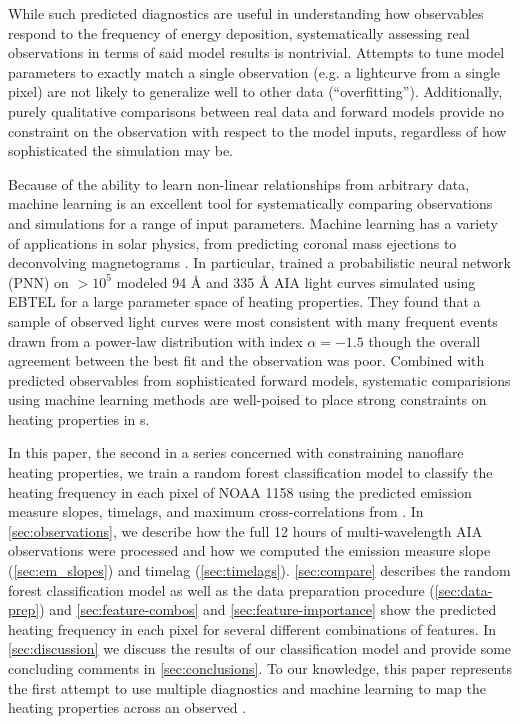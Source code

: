 While such predicted diagnostics are useful in understanding how observables respond to the frequency of energy deposition, systematically assessing real observations in terms of said model results is nontrivial. Attempts to tune model parameters to exactly match a single observation (e.g. a lightcurve from a single pixel) are not likely to generalize well to other data (``overfitting''). Additionally, purely qualitative comparisons between real data and forward models provide no constraint on the observation with respect to the model inputs, regardless of how sophisticated the simulation may be.

Because of the ability to learn non-linear relationships from arbitrary data, machine learning  is an excellent tool for systematically comparing observations and simulations for a range of input parameters. Machine learning has a variety of applications in solar physics, from predicting coronal mass ejections \citep[e.g.][]{bobra_predicting_2016} to deconvolving magnetograms \citep{baso_enhancing_2018}. In particular, \citet{tajfirouze_time-resolved_2016} trained a probabilistic neural network (PNN) on  $>10^5$ modeled 94 \AA{} and 335 \AA{} AIA light curves simulated using EBTEL for a large parameter space of heating properties. They found that a sample of observed light curves were most consistent with many frequent events drawn from a power-law distribution with index $\alpha=-1.5$ though the overall agreement between the best fit and the observation was poor. Combined with predicted observables from sophisticated forward models, systematic comparisions using machine learning methods are well-poised to place strong constraints on heating properties in \AR s.

In this paper, the second in a series concerned with constraining nanoflare heating properties, we train a random forest classification model to classify the heating frequency in each pixel of \AR{} NOAA 1158 using the predicted emission measure slopes, timelags, and maximum cross-correlations from . In \autoref{sec:observations}, we describe how the full 12 hours of multi-wavelength AIA observations were processed and how we computed the emission measure slope (\autoref{sec:em_slopes}) and timelag (\autoref{sec:timelags}). \autoref{sec:compare} describes the random forest classification model as well as the data preparation procedure (\autoref{sec:data-prep}) and \autoref{sec:feature-combos} and \ref{sec:feature-importance} show the predicted heating frequency in each pixel for several different combinations of features. In \autoref{sec:discussion} we discuss the results of our classification model and provide some concluding comments in \autoref{sec:conclusions}. To our knowledge, this paper represents the first attempt to use multiple diagnostics and machine learning to map the heating properties across an observed \AR{}.